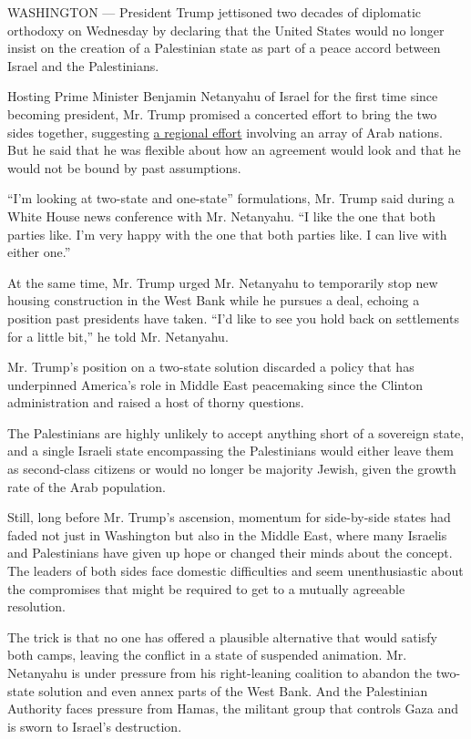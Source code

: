 WASHINGTON --- President Trump jettisoned two decades of diplomatic
orthodoxy on Wednesday by declaring that the United States would no
longer insist on the creation of a Palestinian state as part of a peace
accord between Israel and the Palestinians.

Hosting Prime Minister Benjamin Netanyahu of Israel for the first time
since becoming president, Mr. Trump promised a concerted effort to bring
the two sides together, suggesting
\href{https://www.nytimes.com/2017/02/09/world/middleeast/trump-arabs-palestinians-israel.html}{a
regional effort} involving an array of Arab nations. But he said that he
was flexible about how an agreement would look and that he would not be
bound by past assumptions.

``I'm looking at two-state and one-state'' formulations, Mr. Trump said
during a White House news conference with Mr. Netanyahu. ``I like the
one that both parties like. I'm very happy with the one that both
parties like. I can live with either one.''

At the same time, Mr. Trump urged Mr. Netanyahu to temporarily stop new
housing construction in the West Bank while he pursues a deal, echoing a
position past presidents have taken. ``I'd like to see you hold back on
settlements for a little bit,'' he told Mr. Netanyahu.

Mr. Trump's position on a two-state solution discarded a policy that has
underpinned America's role in Middle East peacemaking since the Clinton
administration and raised a host of thorny questions.

The Palestinians are highly unlikely to accept anything short of a
sovereign state, and a single Israeli state encompassing the
Palestinians would either leave them as second-class citizens or would
no longer be majority Jewish, given the growth rate of the Arab
population.

Still, long before Mr. Trump's ascension, momentum for side-by-side
states had faded not just in Washington but also in the Middle East,
where many Israelis and Palestinians have given up hope or changed their
minds about the concept. The leaders of both sides face domestic
difficulties and seem unenthusiastic about the compromises that might be
required to get to a mutually agreeable resolution.

The trick is that no one has offered a plausible alternative that would
satisfy both camps, leaving the conflict in a state of suspended
animation. Mr. Netanyahu is under pressure from his right-leaning
coalition to abandon the two-state solution and even annex parts of the
West Bank. And the Palestinian Authority faces pressure from Hamas, the
militant group that controls Gaza and is sworn to Israel's destruction.

